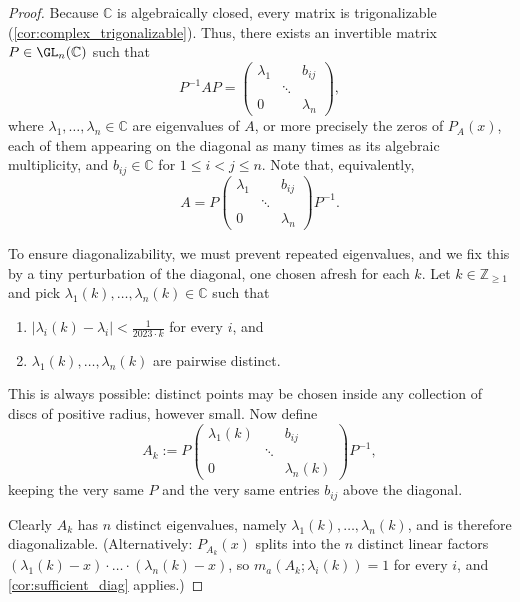 \begin{proof}
  Because $\mathbb{C}$ is algebraically closed, every matrix is trigonalizable (\cref{cor:complex_trigonalizable}). Thus, there exists an invertible matrix $P \in \GL_n(\mathbb{C})$ such that
  \[ P^{-1} A P = \begin{pmatrix} \lambda_1 & & b_{ij} \\ & \ddots & \\ 0 & & \lambda_n \end{pmatrix}, \]
  where $\lambda_1, \dots, \lambda_n \in \mathbb{C}$ are  eigenvalues of $A$, or more precisely the zeros of $P_A(x)$, each of them appearing on the diagonal as many times as its algebraic multiplicity, and $b_{ij} \in \mathbb{C}$ for $1 \le i < j \le n$. Note that, equivalently,
  \begin{equation} \label{eq:trigonalized_A}
    A = P \begin{pmatrix} \lambda_1 & & b_{ij} \\ & \ddots & \\ 0 & & \lambda_n \end{pmatrix} P^{-1}.
  \end{equation}

  To ensure diagonalizability, we must prevent repeated eigenvalues, and we fix this by a tiny perturbation of the diagonal, one chosen afresh for each $k$. Let $k \in \mathbb{Z}_{\ge 1}$ and pick $\lambda_1(k), \dots, \lambda_n(k) \in \mathbb{C}$ such that
  \begin{enumerate}[label=\textbf{(\alph*)}]
    \item $\left| \lambda_i(k) - \lambda_i \right| < \frac{1}{2023 \cdot k}$ for every $i$, and
    \item $\lambda_1(k), \dots, \lambda_n(k)$ are pairwise distinct.
  \end{enumerate}
  This is always possible: distinct points may be chosen inside any collection of discs of positive radius, however small. Now define
  \[
  A_k := P \begin{pmatrix} \lambda_1(k) & & b_{ij} \\ & \ddots & \\ 0 & & \lambda_n(k) \end{pmatrix} P^{-1},
  \]
  keeping the very same $P$ and the very same entries $b_{ij}$ above the diagonal.

  Clearly $A_k$ has $n$ distinct eigenvalues, namely $\lambda_1(k), \dots, \lambda_n(k)$, and is therefore diagonalizable. (Alternatively: $P_{A_k}(x)$ splits into the $n$ distinct linear factors $(\lambda_1(k) - x) \cdot \dots \cdot (\lambda_n(k) - x)$, so $m_a(A_k; \lambda_i(k)) = 1$ for every $i$, and \cref{cor:sufficient_diag} applies.)


\end{proof}
